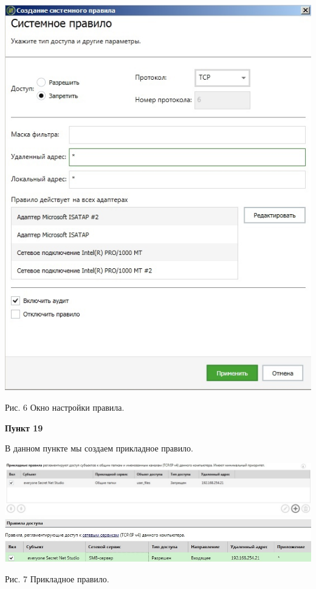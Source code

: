 \documentclass[a4paper,14pt]{extarticle}
\begin{document}
\begin{center}
\begin{multicols}{2}
            \includegraphics[scale=0.4]{pics/18_2.jpg}
        \end{multicols}

       Рис. 6 Окно настройки правила.
    \end{center}

    \newpage
    \textbf{Пункт 19}
    \vspace{-3ex}
    \begin{center}
        \singlespacing
        В данном пункте мы создаем прикладное правило.

        \includegraphics[scale=0.42]{pics/19_1.jpg}\\
        \includegraphics[scale=0.55]{pics/19_2.jpg}

        Рис. 7 Прикладное правило.
    \end{center}
  
\end{document}
